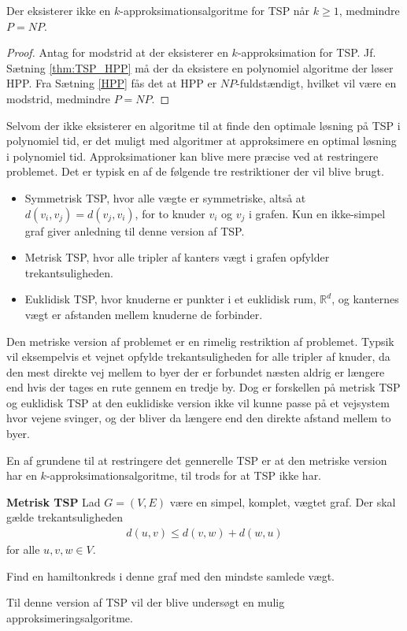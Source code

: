 \begin{tcolorbox}
	\begin{cor}
		Der eksisterer ikke en $k$-approksimationsalgoritme for TSP når $k \geq 1$, medmindre $P = NP$.
	\end{cor}
\end{tcolorbox}
\begin{proof}
	Antag for modstrid at der eksisterer en $k$-approksimation for TSP.
	Jf. Sætning \ref{thm:TSP_HPP} må der da eksistere en polynomiel algoritme der løser HPP. 
	Fra Sætning \ref{HPP} fås det at HPP er $NP$-fuldstændigt, hvilket vil være en modstrid, medmindre $P=NP$.
\end{proof}

Selvom der ikke eksisterer en algoritme til at finde den optimale løsning på TSP i polynomiel tid, er det muligt med algoritmer at approksimere en optimal løsning i polynomiel tid. Approksimationer kan blive mere præcise ved at restringere problemet.
Det er typisk en af de følgende tre restriktioner der vil blive brugt. \citep{complex} 
\begin{itemize}[noitemsep]
	\item Symmetrisk TSP, hvor alle vægte er symmetriske, altså at $d(v_i, v_j) = d(v_j, v_i)$, for to knuder $v_i$ og $v_j$ i grafen. Kun en ikke-simpel graf giver anledning til denne version af TSP.
	\item Metrisk TSP, hvor alle tripler af kanters vægt i grafen opfylder trekantsuligheden.
	\item Euklidisk TSP, hvor knuderne er punkter i et euklidisk rum, ${\mathbb{R}}^d$, og kanternes vægt er afstanden mellem knuderne de forbinder.
\end{itemize}

Den metriske version af problemet er en rimelig restriktion af problemet.
Typsik vil eksempelvis et vejnet opfylde trekantsuligheden for alle tripler af knuder, da den mest direkte vej mellem to byer der er forbundet næsten aldrig er længere end hvis der tages en rute gennem en tredje by.
Dog er forskellen på metrisk TSP og euklidisk TSP at den euklidiske version ikke vil kunne passe på et vejsystem hvor vejene svinger, og der bliver da længere end den direkte afstand mellem to byer.

En af grundene til at restringere det gennerelle TSP er at den metriske version har en $k$-approksimationsalgoritme, til trods for at TSP ikke har.

\begin{tcolorbox}
	\textbf{Metrisk TSP} \quad Lad $G=(V,E)$ være en simpel, komplet, vægtet graf. Der skal gælde trekantsuligheden
	\begin{align*}
		d(u,v) \leq d(v,w) + d(w,u)
	\end{align*}
	for alle $u,v,w \in V$.

	Find en hamiltonkreds i denne graf med den mindste samlede vægt.
\end{tcolorbox}

Til denne version af TSP vil der blive undersøgt en mulig approksimeringsalgoritme.
